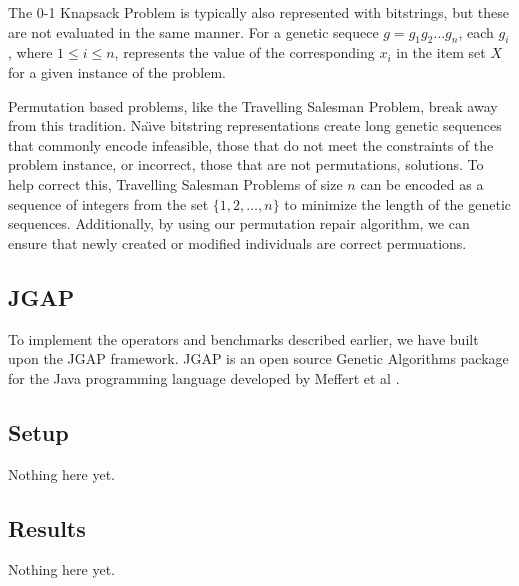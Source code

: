 The  0-1 Knapsack Problem is typically also represented with bitstrings, but these are not evaluated in the same manner. For a genetic sequece $g = g_1 g_2 \ldots g_n$, each $g_i$, where $1 \leq i \leq n$, represents the value of the corresponding $x_i$ in the item set $X$ for a given instance of the problem. 

Permutation based problems, like the Travelling Salesman Problem, break away from this tradition. Na\"{\i}ve bitstring representations create long genetic sequences that commonly encode infeasible, those that do not meet the constraints of the problem instance, or incorrect, those that are not permutations, solutions\cite{Potvin96}. To help correct this, Travelling Salesman Problems of size $n$ can be encoded as a sequence of integers from the set $\{1, 2, \ldots, n\}$ to minimize the length of the genetic sequences. Additionally, by using our permutation repair algorithm, we can ensure that newly created or modified individuals are correct permuations.

\subsection*{JGAP}
To implement the operators and benchmarks described earlier, we have built upon the JGAP framework. JGAP is an open source Genetic Algorithms package for the Java programming language developed by Meffert et al \cite{jgap}. 

\subsection*{Setup}
Nothing here yet.

\subsection*{Results}
Nothing here yet.